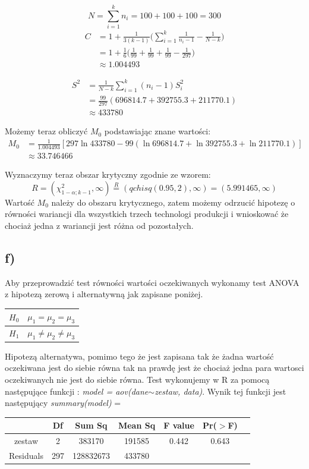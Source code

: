 \documentclass{article}
\begin{document}
\[ N = \sum_{i=1}^k n_i = 100 + 100 + 100 = 300 \]
\begin{align*}
C & = 1 + \frac{1}{3(k-1)} \big( \sum_{i=1}^k \frac{1}{n_i-1} - \frac{1}{N-k} \big) \\
& = 1 + \frac{1}{6} \big(\frac{1}{99} + \frac{1}{99} + \frac{1}{99} - \frac{1}{297}\big) \\
& \approx 1.004493
\end{align*}

\begin{align*}
S^2 & = \frac{1}{N-k} \sum_{i=1}^k (n_i - 1) S_i^2 \\
& = \frac{99}{297} (696814.7 + 392755.3 + 211770.1) \\
& \approx 433780
\end{align*}

Możemy teraz obliczyć $M_0$ podstawiając znane wartości:
\begin{align*}
M_0 & = \frac{1}{1.004493} \left[ 297 \ln{433780} - 99 (\ln{696814.7} + \ln{392755.3} + \ln{211770.1}) \right] \\
& \approx 33.746466
\end{align*}

Wyznaczymy teraz obszar krytyczny zgodnie ze wzorem:
\[ R = (\chi^2_{1-\alpha;k-1}, \infty) \overset{R}{=} (qchisq(0.95, 2), \infty) = (5.991465, \infty) \]
Wartość $M_0$ należy do obszaru krytycznego, zatem możemy odrzucić hipotezę o równości wariancji dla wszystkich trzech technologi produkcji i wnioskować że chociaż jedna z wariancji jest różna od pozostałych.

\subsection{f)}
Aby przeprowadzić test równości wartości oczekiwanych wykonamy test ANOVA z hipotezą zerową i alternatywną jak zapisane poniżej.
\begin{center} \begin{tabular}{|c|c|} \hline
$H_0$ & $\mu_1 = \mu_2 = \mu_3$ \\ \hline
$H_1$ & $\mu_1 \neq \mu_2 \neq \mu_3$ \\ \hline
\end{tabular} \end{center}
Hipotezą alternatywa, pomimo tego że jest zapisana tak że żadna wartość oczekiwana jest do siebie równa tak na prawdę jest że chociaż jedna para wartosci oczekiwanych nie jest do siebie równa. Test wykonujemy w R za pomocą następujące funkcji : \textit{model = aov(dane$\sim$zestaw, data)}. Wynik tej funkcji jest następujący \textit{summary(model)} =
\begin{center} \begin{tabular}{|c|c|c|c|c|c|c|} \hline
 & Df & Sum Sq & Mean Sq & F value & Pr($>$F) & \\ \hline
zestaw & 2 & 383170 & 191585 & 0.442 & 0.643 & \\ \hline
Residuals & 297 & 128832673 & 433780 & & & \\ \hline
\end{tabular} \end{center}
\end{document}
